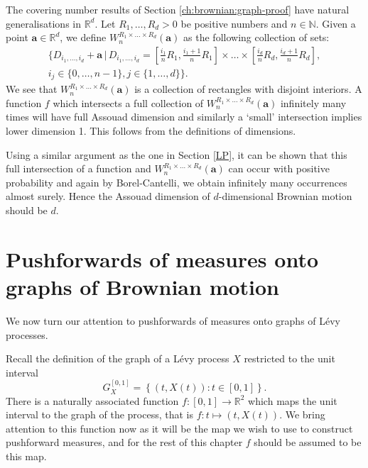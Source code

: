 The covering number results of Section \ref{ch:brownian:graph-proof} have natural generalisations in $\mathbb{R}^d$. Let $R_1,\dots,R_d>0$ be positive numbers and $n\in \mathbb{N}$. Given a point $\mathbf{a}\in\mathbb{R}^d$, we define $W_{n}^{R_1\times\dots\times R_d}(\mathbf{a})$ as the following collection of sets:
\begin{eqnarray*}
	\Bigg\{D_{i_1,\dots,i_d}+\mathbf{a} \, \vert \, D_{i_1,\dots,i_d}=\left[\frac{i_1}{n}R_1,\frac{i_1+1}{n}R_1\right]\times\dots\times \left[\frac{i_d}{n}R_d,\frac{i_d+1}{n}R_d\right],\\ i_j\in\{0,\dots,n-1\}, j\in\{1,\dots,d\}\Bigg\}.
\end{eqnarray*}
We see that $W_{n}^{R_1\times\dots\times R_d}(\mathbf{a})$ is a collection of rectangles with disjoint interiors. A function $f$ which intersects a full collection of $W_{n}^{R_1\times\dots\times R_d}(\mathbf{a})$ infinitely many times will have full Assouad dimension and similarly a `small' intersection implies lower dimension 1. This follows from the definitions of dimensions.

Using a similar argument as the one in Section \ref{LP}, it can be shown that this full intersection of a function and $W_{n}^{R_1\times\dots\times R_d}(\mathbf{a})$ can occur with positive probability and again by Borel-Cantelli, we obtain infinitely many occurrences almost surely. Hence the Assouad dimension of $d$-dimensional Brownian motion should be $d$. 















\section{Pushforwards of measures onto graphs of Brownian motion}


We now turn our attention to pushforwards of measures onto graphs of L\'evy processes.


Recall the definition of the graph of a L\'evy process $X$ restricted to the unit interval
\[
G_X^{[0,1]} = \left\{ (t,X(t)) \colon t \in [0,1] \right\}.
\]
There is a naturally associated function $f: [0,1] \rightarrow \mathbb{R}^2$ which maps the unit interval to the graph of the process, that is $f\colon t \mapsto (t,X(t))$. We bring attention to this function now as it will be the map we wish to use to construct pushforward measures, and for the rest of this chapter $f$ should be assumed to be this map. 





